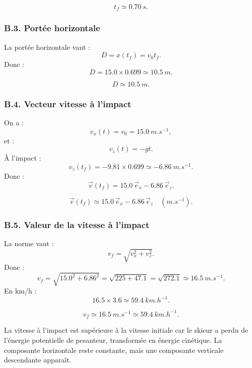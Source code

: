 \documentclass[11pt,a4paper]{article}
\begin{document}
\begin{resultatbox}
\[
\boxed{t_f\simeq \SI{0.70}{s}.}
\]
\end{resultatbox}

\subsubsection*{B.3. Portée horizontale}

La portée horizontale vaut :
\[
D=x(t_f)=v_0t_f.
\]
Donc :
\[
D=15.0\times 0.699\simeq 10.5\ \si{m}.
\]

\begin{resultatbox}
\[
\boxed{D\simeq \SI{10.5}{m}.}
\]
\end{resultatbox}

\subsubsection*{B.4. Vecteur vitesse à l'impact}

On a :
\[
v_x(t)=v_0=15.0\ \si{m.s^{-1}},
\]
et :
\[
v_z(t)=-gt.
\]
À l'impact :
\[
v_z(t_f)=-9.81\times 0.699\simeq -6.86\ \si{m.s^{-1}}.
\]
Donc :
\[
\vec v(t_f)=15.0\,\vec e_x-6.86\,\vec e_z.
\]

\begin{resultatbox}
\[
\boxed{\vec v(t_f)\simeq 15.0\,\vec e_x-6.86\,\vec e_z\quad (\si{m.s^{-1}}).}
\]
\end{resultatbox}

\subsubsection*{B.5. Valeur de la vitesse à l'impact}

La norme vaut :
\[
v_f=\sqrt{v_x^2+v_z^2}.
\]
Donc :
\[
v_f=\sqrt{15.0^2+6.86^2}
=\sqrt{225+47.1}
=\sqrt{272.1}
\simeq 16.5\ \si{m.s^{-1}}.
\]
En km/h :
\[
16.5\times 3.6\simeq 59.4\ \si{km.h^{-1}}.
\]

\begin{resultatbox}
\[
\boxed{v_f\simeq \SI{16.5}{m.s^{-1}}\simeq \SI{59.4}{km.h^{-1}}.}
\]
\end{resultatbox}

\begin{remarquebox}
La vitesse à l'impact est supérieure à la vitesse initiale car le skieur a perdu de l'énergie potentielle de pesanteur,
transformée en énergie cinétique. La composante horizontale reste constante, mais une composante verticale descendante apparaît.
\end{remarquebox}
\end{document}
